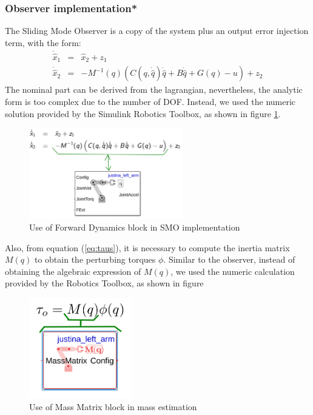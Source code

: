 \documentclass[a4paper, 10pt]{article}
\begin{document}
\subsubsection{Observer implementation*}
The Sliding Mode Observer is a copy of the system plus an output error injection term, with the form:
  \begin{eqnarray}
    \dot{\hat{x}}_1 &=& \hat{x}_2 + z_1\label{eq:observer1}\\
    \dot{\hat{x}}_2 &=& -M^{-1}(q)\left(C(q, \dot{\hat{q}})\dot{\hat{q}} + B\dot{\hat{q}} + G(q) - u\right) + z_2\label{eq:observer2}
  \end{eqnarray}
  The nominal part can be derived from the lagrangian, nevertheless, the analytic form is too complex due to the number of DOF. Instead, we used the numeric solution provided by the Simulink Robotics Toolbox, as shown in figure \ref{fig:SimulinkSMO}.
  \begin{figure}
    \centering
    \includegraphics[width=0.6\textwidth]{Figures/SMOwithSimulink.png}
    \caption{Use of Forward Dynamics block in SMO implementation}
    \label{fig:SimulinkSMO}
  \end{figure}
  

  Also, from equation (\ref{eq:taus}), it is necessary to compute the inertia matrix $M(q)$ to obtain the perturbing torques $\phi$. Similar to the observer, instead of obtaining the algebraic expression of $M(q)$, we used the numeric calculation provided by the Robotics Toolbox, as shown in figure

  \begin{figure}
    \centering
    \includegraphics[width=0.4\textwidth]{Figures/MassEst.png}
    \caption{Use of Mass Matrix block in mass estimation}
  \end{figure}
\end{document}
